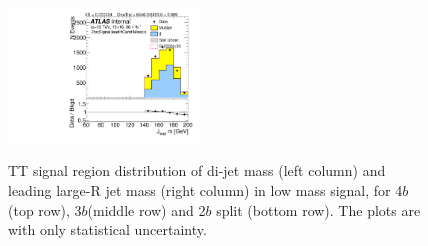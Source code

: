 \begin{figure}[htbp!]
\begin{center}
\includegraphics[width=0.45\textwidth,angle=-90]{figures/boosted/TT/Moriond_TT_TwoTag_split_Signal_leadHCand_Mass_s.pdf}\\
\end{center}
\caption{TT signal region distribution of di-jet mass (left column) and leading large-R jet mass (right column) in low mass signal, for 4$b$ (top row), 3$b$(middle row) and 2$b$ split (bottom row). The plots are with only statistical uncertainty.}
\label{CRSB:TTSR_Distribution}
\end{figure}
